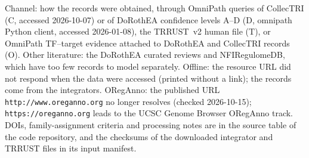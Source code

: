 \begin{table}[htbp]
\par\smallskip
\begin{minipage}{\linewidth}\footnotesize
Channel: how the records were obtained, through OmniPath queries of CollecTRI (C, accessed 2026-10-07) or of DoRothEA confidence levels A--D (D, omnipath Python client, accessed 2026-01-08), the TRRUST~v2 human file (T), or OmniPath TF--target evidence attached to DoRothEA and CollecTRI records (O). Other literature: the DoRothEA curated reviews and NFIRegulomeDB, which have too few records to model separately. Offline: the resource URL did not respond when the data were accessed (printed without a link); the records come from the integrators. ORegAnno: the published URL \nolinkurl{http://www.oreganno.org} no longer resolves (checked 2026-10-15); \nolinkurl{https://oreganno.org} leads to the UCSC Genome Browser ORegAnno track. DOIs, family-assignment criteria and processing notes are in the source table of the code repository, and the checksums of the downloaded integrator and TRRUST files in its input manifest.
\end{minipage}
\end{table}
